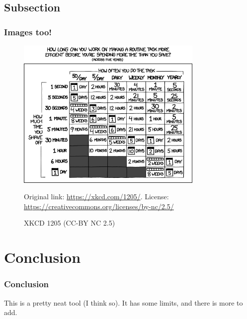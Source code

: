 \documentclass{beamer}
\begin{document}
\subsection{Subsection}

\begin{frame}
\frametitle{Images too!}
\begin{figure}
\includegraphics[width=0.8\textwidth,height=0.6\textheight,keepaspectratio]{assets/is_it_worth_the_time.png}
\caption{XKCD 1205 (CC-BY NC 2.5)}
\label{figure0}
Original link: \url{https://xkcd.com/1205/}.
License: \url{https://creativecommons.org/licenses/by-nc/2.5/}
\end{figure}
\end{frame}

\section{Conclusion}

\begin{frame}
\frametitle{Conclusion}
This is a pretty neat tool (I think so).
It has some limits, and there is more to add.
\end{frame}
\end{document}
